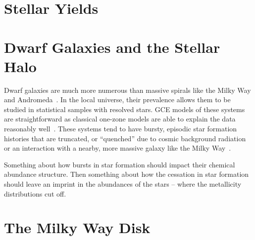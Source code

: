 \documentclass[main.tex]{subfiles}
\begin{document}
\begin{doublespace}
\section{Stellar Yields}
\label{main:sec:intro:yields}

\section{Dwarf Galaxies and the Stellar Halo}
\label{main:sec:intro:dwarfs}

Dwarf galaxies are much more numerous than massive spirals like the Milky Way
and Andromeda~\citep[e.g.,][]{Bell2003, Baldry2012}.
In the local universe, their prevalence allows them to be studied in
statistical samples with resolved stars.
GCE models of these systems are straightforward as classical one-zone models
are able to explain the data reasonably well~\citep[see, e.g.,][]{Kirby2011,
delosReyes2022}.
These systems tend to have bursty, episodic star formation histories
\citep[e.g.,][]{Weisz2014a} that are truncated, or ``quenched'' due to cosmic
background radiation or an interaction with a nearby, more massive galaxy like
the Milky Way~\citep[e.g.,][]{Weisz2014b, Weisz2015, Naidu2022}.
\par
{\color{red}
Something about how bursts in star formation should impact their chemical
abundance structure.
Then something about how the cessation in star formation should leave an
imprint in the abundances of the stars -- where the metallicity distributions
cut off.
}

\section{The Milky Way Disk}
\label{main:sec:intro:mw}


\end{doublespace}
\end{document}
